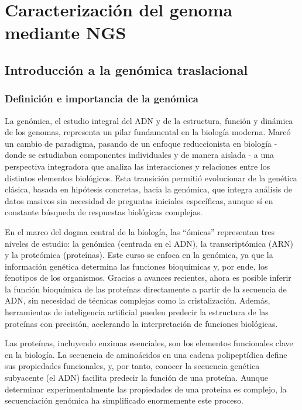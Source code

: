 \part{Caracterización del genoma mediante NGS}
\chapter{Introducción a la genómica traslacional}
\section{Definición e importancia de la genómica}
La genómica, el estudio integral del ADN y de la estructura, función y dinámica de los genomas, representa un pilar fundamental en la biología moderna. Marcó un cambio de paradigma, pasando de un enfoque reduccionista en biología - donde se estudiaban componentes individuales y de manera aislada - a una perspectiva integradora que analiza las interacciones y relaciones entre los distintos elementos biológicos. Esta transición permitió evolucionar de la genética clásica, basada en hipótesis concretas, hacia la genómica, que integra análisis de datos masivos sin necesidad de preguntas iniciales específicas, aunque sí en constante búsqueda de respuestas biológicas complejas.

En el marco del dogma central de la biología, las “ómicas” representan tres niveles de estudio: la genómica (centrada en el ADN), la transcriptómica (ARN) y la proteómica (proteínas). Este curso se enfoca en la genómica, ya que la información genética determina las funciones bioquímicas y, por ende, los fenotipos de los organismos. Gracias a avances recientes, ahora es posible inferir la función bioquímica de las proteínas directamente a partir de la secuencia de ADN, sin necesidad de técnicas complejas como la cristalización. Además, herramientas de inteligencia artificial pueden predecir la estructura de las proteínas con precisión, acelerando la interpretación de funciones biológicas.

Las proteínas, incluyendo enzimas esenciales, son los elementos funcionales clave en la biología. La secuencia de aminoácidos en una cadena polipeptídica define sus propiedades funcionales, y, por tanto, conocer la secuencia genética subyacente (el ADN) facilita predecir la función de una proteína. Aunque determinar experimentalmente las propiedades de una proteína es complejo, la secuenciación genómica ha simplificado enormemente este proceso.

